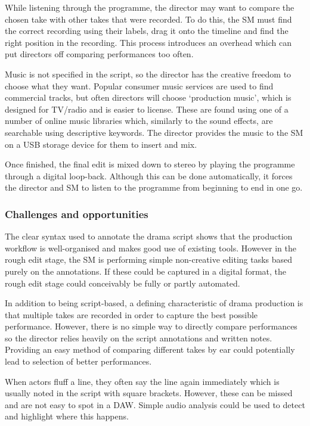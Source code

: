 While listening through the programme, the director may want to compare the chosen take with other takes that were
recorded. To do this, the SM must find the correct recording using their labels, drag it onto the timeline and find the
right position in the recording. This process introduces an overhead which can put directors off comparing performances
too often.

Music is not specified in the script, so the director has the creative freedom to choose what they want. Popular
consumer music services are used to find commercial tracks, but often directors will choose `production music', which
is designed for TV/radio and is easier to license. These are found using one of a number of online music libraries
which, similarly to the sound effects, are searchable using descriptive keywords. The director provides the music to
the SM on a USB storage device for them to insert and mix.

Once finished, the final edit is mixed down to stereo by playing the programme through a digital loop-back. Although
this can be done automatically, it forces the director and SM to listen to the programme from beginning to end in one
go.

\subsubsection{Challenges and opportunities}
The clear syntax used to annotate the drama script shows that the production workflow is well-organised and makes good
use of existing tools. However in the rough edit stage, the SM is performing simple non-creative editing tasks based
purely on the annotations. If these could be captured in a digital format, the rough edit stage could conceivably be
fully or partly automated.

In addition to being script-based, a defining characteristic of drama production is that multiple takes are recorded in
order to capture the best possible performance. However, there is no simple way to directly compare performances so the
director relies heavily on the script annotations and written notes. Providing an easy method of comparing different
takes by ear could potentially lead to selection of better performances.

When actors fluff a line, they often say the line again immediately which is usually noted in the script with square
brackets. However, these can be missed and are not easy to spot in a DAW. Simple audio analysis could be used to detect
and highlight where this happens.


